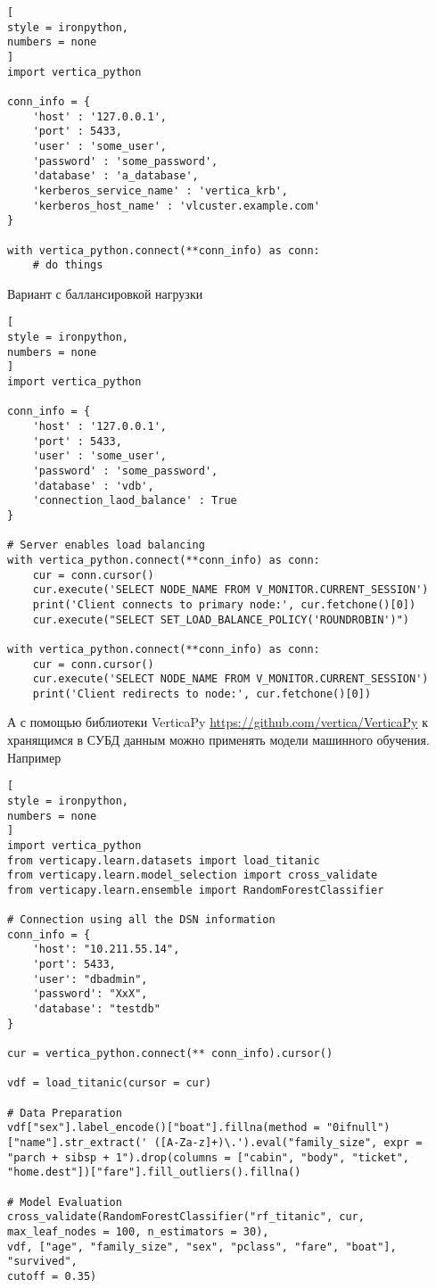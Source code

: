 \documentclass[%
	11pt,
	a4paper,
	utf8,
		]{article}
\begin{document}
\begin{lstlisting}[
style = ironpython,
numbers = none
]
import vertica_python

conn_info = {
	'host' : '127.0.0.1',
	'port' : 5433,
	'user' : 'some_user',
	'password' : 'some_password',
	'database' : 'a_database',
	'kerberos_service_name' : 'vertica_krb',
	'kerberos_host_name' : 'vlcuster.example.com'
}

with vertica_python.connect(**conn_info) as conn:
	# do things
\end{lstlisting}

Вариант с баллансировкой нагрузки
\begin{lstlisting}[
style = ironpython,
numbers = none
]
import vertica_python

conn_info = {
	'host' : '127.0.0.1',
	'port' : 5433,
	'user' : 'some_user',
	'password' : 'some_password',
	'database' : 'vdb',
	'connection_laod_balance' : True
}

# Server enables load balancing
with vertica_python.connect(**conn_info) as conn:
	cur = conn.cursor()
	cur.execute('SELECT NODE_NAME FROM V_MONITOR.CURRENT_SESSION')
	print('Client connects to primary node:', cur.fetchone()[0])
	cur.execute("SELECT SET_LOAD_BALANCE_POLICY('ROUNDROBIN')")

with vertica_python.connect(**conn_info) as conn:
	cur = conn.cursor()
	cur.execute('SELECT NODE_NAME FROM V_MONITOR.CURRENT_SESSION')
	print('Client redirects to node:', cur.fetchone()[0])
\end{lstlisting}

А с помощью библиотеки VerticaPy \url{https://github.com/vertica/VerticaPy} к хранящимся в СУБД данным можно применять модели машинного обучения. Например
\begin{lstlisting}[
style = ironpython,
numbers = none	
]
import vertica_python
from verticapy.learn.datasets import load_titanic
from verticapy.learn.model_selection import cross_validate
from verticapy.learn.ensemble import RandomForestClassifier

# Connection using all the DSN information
conn_info = {
	'host': "10.211.55.14", 
	'port': 5433, 
	'user': "dbadmin", 
	'password': "XxX", 
	'database': "testdb"
}

cur = vertica_python.connect(** conn_info).cursor()

vdf = load_titanic(cursor = cur)

# Data Preparation
vdf["sex"].label_encode()["boat"].fillna(method = "0ifnull")["name"].str_extract(' ([A-Za-z]+)\.').eval("family_size", expr = "parch + sibsp + 1").drop(columns = ["cabin", "body", "ticket", "home.dest"])["fare"].fill_outliers().fillna()

# Model Evaluation
cross_validate(RandomForestClassifier("rf_titanic", cur, max_leaf_nodes = 100, n_estimators = 30), 
vdf, ["age", "family_size", "sex", "pclass", "fare", "boat"], 
"survived", 
cutoff = 0.35)
\end{lstlisting}
\end{document}
